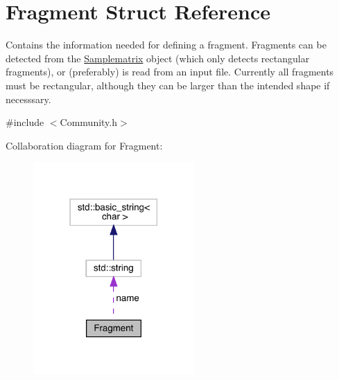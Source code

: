 \hypertarget{struct_fragment}{}\section{Fragment Struct Reference}
\label{struct_fragment}


Contains the information needed for defining a fragment. Fragments can be detected from the \hyperlink{class_samplematrix}{Samplematrix} object (which only detects rectangular fragments), or (preferably) is read from an input file. Currently all fragments must be rectangular, although they can be larger than the intended shape if necesssary.  




{\ttfamily \#include $<$Community.\+h$>$}



Collaboration diagram for Fragment\+:
\nopagebreak
\begin{figure}[H]
\begin{center}
\leavevmode
\includegraphics[width=174pt]{struct_fragment__coll__graph}
\end{center}
\end{figure}
